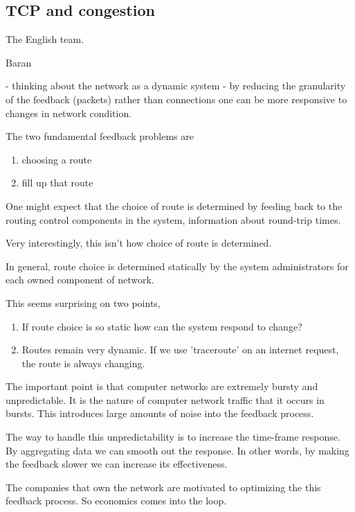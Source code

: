\subsection{TCP and congestion}


The English team.

Baran

- thinking about the network as a dynamic system
- by reducing the granularity of the feedback (packets) rather than connections one can be more
  responsive to changes in network condition.


The two fundamental feedback problems are

\begin{enumerate}
    \item choosing a route
    \item fill up that route
\end{enumerate}


One might expect that the choice of route is determined by feeding back to the routing control
components in the system, information about round-trip times.

Very interestingly, this isn't how choice of route is determined.

In general, route choice is determined statically by the system administrators for each owned
component of network.  

This seems surprising on two points,

\begin{enumerate}
    \item If route choice is so static how can the system respond to change?
    \item Routes remain very dynamic. If we use 'traceroute' on an internet request, the route is
        always changing.
\end{enumerate}

The important point is that computer networks are extremely bursty and unpredictable. It is the
nature of computer network traffic that it occurs in bursts. This introduces large amounts of noise
into the feedback process. 

The way to handle this unpredictability is to increase the time-frame response. By aggregating data
we can smooth out the response. In other words, by making the feedback slower we can increase its
effectiveness.   

The companies that own the network are motivated to optimizing the this feedback process. So
economics comes into the loop.


